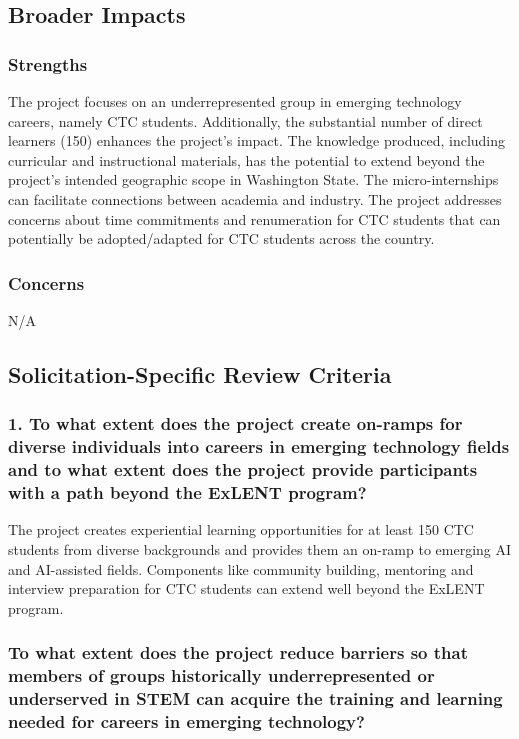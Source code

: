 \subsection{Broader Impacts}

\subsubsection{Strengths}

The project focuses on an underrepresented group in emerging technology careers, namely CTC students. Additionally, the substantial number of direct learners (150) enhances the project's impact. The knowledge produced, including curricular and instructional materials, has the potential to extend beyond the project's intended geographic scope in Washington State. The micro-internships can facilitate connections between academia and industry. The project addresses concerns about time commitments and renumeration for CTC students that can potentially be adopted/adapted for CTC students across the country. 

\subsubsection{Concerns}

N/A 

\subsection{Solicitation-Specific Review Criteria}

\subsubsection{1. To what extent does the project create on-ramps for diverse individuals into careers in emerging technology fields and to what extent does the project provide participants with a path beyond the ExLENT program?}

The project creates experiential learning opportunities for at least 150 CTC students from diverse backgrounds and provides them an on-ramp to emerging AI and AI-assisted fields. Components like community building, mentoring and interview preparation for CTC students can extend well beyond the ExLENT program. 

\subsubsection{To what extent does the project reduce barriers so that members of groups historically underrepresented or underserved in STEM can acquire the training and learning needed for careers in emerging technology?}

